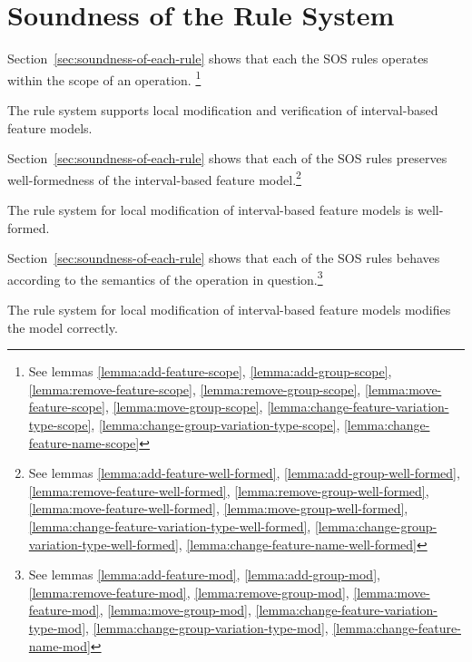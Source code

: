\section{Soundness of the Rule System}
Section~\vref{sec:soundness-of-each-rule} shows that each the SOS rules operates within the scope of an operation. \footnote{See lemmas \ref{lemma:add-feature-scope}, \ref{lemma:add-group-scope}, \ref{lemma:remove-feature-scope}, \ref{lemma:remove-group-scope}, \ref{lemma:move-feature-scope}, \ref{lemma:move-group-scope}, \ref{lemma:change-feature-variation-type-scope}, \ref{lemma:change-group-variation-type-scope}, \ref{lemma:change-feature-name-scope}}
\\
\begin{theorem}
  The rule system supports local modification and verification of interval-based feature models.
\end{theorem}

Section~\vref{sec:soundness-of-each-rule} shows that each of the SOS rules preserves well-formedness of the interval-based feature model.\footnote{See lemmas \ref{lemma:add-feature-well-formed}, \ref{lemma:add-group-well-formed}, \ref{lemma:remove-feature-well-formed}, \ref{lemma:remove-group-well-formed}, \ref{lemma:move-feature-well-formed}, \ref{lemma:move-group-well-formed}, \ref{lemma:change-feature-variation-type-well-formed}, \ref{lemma:change-group-variation-type-well-formed}, \ref{lemma:change-feature-name-well-formed}}
\\
\begin{theorem}
  The rule system for local modification of interval-based feature models is well-formed.
\end{theorem}

Section~\vref{sec:soundness-of-each-rule} shows that each of the SOS rules behaves according to the semantics of the operation in question.\footnote{See lemmas \ref{lemma:add-feature-mod}, \ref{lemma:add-group-mod}, \ref{lemma:remove-feature-mod}, \ref{lemma:remove-group-mod}, \ref{lemma:move-feature-mod}, \ref{lemma:move-group-mod}, \ref{lemma:change-feature-variation-type-mod}, \ref{lemma:change-group-variation-type-mod}, \ref{lemma:change-feature-name-mod}}
\\
\begin{theorem}
  The rule system for local modification of interval-based feature models modifies the model correctly.
\end{theorem}
